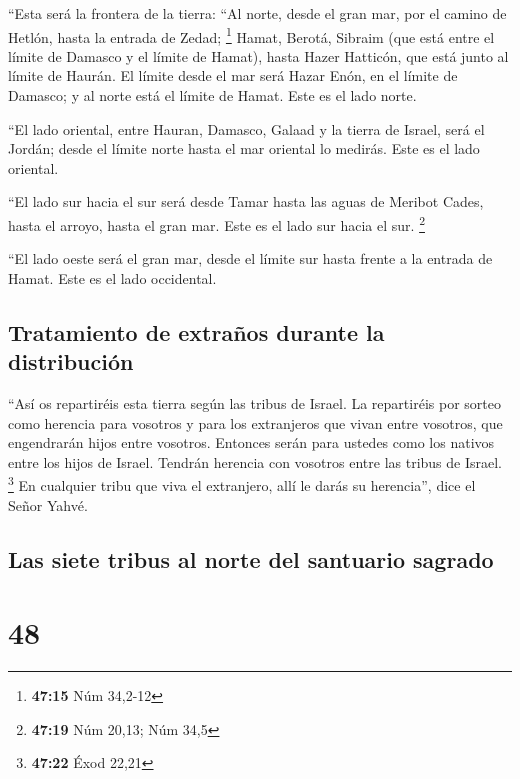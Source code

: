  ``Esta será la frontera de la tierra: ``Al norte, desde
el gran mar, por el camino de Hetlón, hasta la entrada de Zedad;
\footnote{\textbf{47:15} Núm 34,2-12}  Hamat, Berotá,
Sibraim (que está entre el límite de Damasco y el límite de Hamat),
hasta Hazer Hatticón, que está junto al límite de Haurán.
 El límite desde el mar será Hazar Enón, en el límite de
Damasco; y al norte está el límite de Hamat. Este es el lado norte.

 ``El lado oriental, entre Hauran, Damasco, Galaad y la
tierra de Israel, será el Jordán; desde el límite norte hasta el mar
oriental lo medirás. Este es el lado oriental.

 ``El lado sur hacia el sur será desde Tamar hasta las
aguas de Meribot Cades, hasta el arroyo, hasta el gran mar. Este es el
lado sur hacia el sur. \footnote{\textbf{47:19} Núm 20,13; Núm 34,5}

 ``El lado oeste será el gran mar, desde el límite sur
hasta frente a la entrada de Hamat. Este es el lado occidental.

\hypertarget{tratamiento-de-extrauxf1os-durante-la-distribuciuxf3n}{%
\subsection{Tratamiento de extraños durante la
distribución}\label{tratamiento-de-extrauxf1os-durante-la-distribuciuxf3n}}

 ``Así os repartiréis esta tierra según las tribus de
Israel.  La repartiréis por sorteo como herencia para
vosotros y para los extranjeros que vivan entre vosotros, que
engendrarán hijos entre vosotros. Entonces serán para ustedes como los
nativos entre los hijos de Israel. Tendrán herencia con vosotros entre
las tribus de Israel. \footnote{\textbf{47:22} Éxod 22,21}
 En cualquier tribu que viva el extranjero, allí le darás
su herencia'', dice el Señor Yahvé.

\hypertarget{las-siete-tribus-al-norte-del-santuario-sagrado}{%
\subsection{Las siete tribus al norte del santuario
sagrado}\label{las-siete-tribus-al-norte-del-santuario-sagrado}}

\hypertarget{section-47}{%
\section{48}\label{section-47}}

